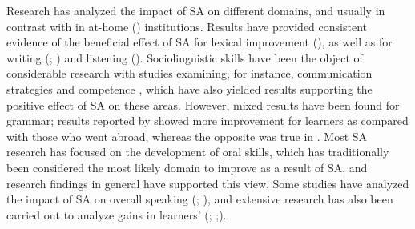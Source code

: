\documentclass[output=paper]{langsci/langscibook}
\begin{document}
Research has analyzed the impact of SA on different  domains, and usually in contrast with  in at-home () institutions. Results have provided consistent evidence of the beneficial effect of SA for lexical improvement (\citealt{Collentine2004,LlanesMuñoz2009}), as well as for writing (\citealt{Sasaki2004}; \citealt{Pérez-VidalJuan-Garau2011}) and listening (\citealt{AllenHerron2003,LlanesMuñoz2009}). Sociolinguistic skills have been the object of considerable research with studies examining, for instance, communication strategies \citep{Lafford1995} and  competence \citep{Barron2006}, which have also yielded results supporting the positive effect of SA on these areas. However, mixed results have been found for grammar; results reported by \citet{Collentine2004} showed more  improvement for  learners as compared with those who went abroad, whereas the opposite was true in \citet{Howard2005}. Most SA research has focused on the development of oral skills, which has traditionally been considered the most likely  domain to improve as a result of SA, and research findings in general have supported this view. Some studies have analyzed the impact of SA on overall  speaking  (\citealt{BrechtEtAl1995}; \citealt{SegalowitzFreed2004}), and extensive research has also been carried out to analyze gains in  learners’  (\citealt{Freed1995chapter}; \citealt{FreedEtAl2004};\citealt{Valls-Ferrer2011}). 
\end{document}
